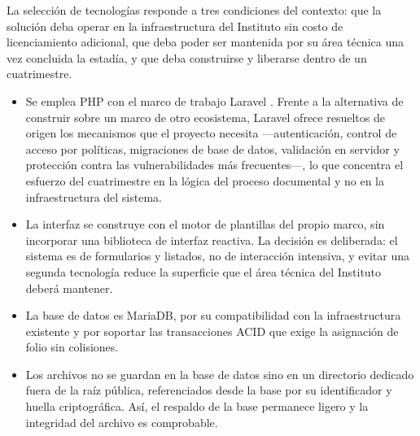 La selección de tecnologías responde a tres condiciones del contexto: que la solución deba operar en la infraestructura del Instituto sin costo de licenciamiento adicional, que deba poder ser mantenida por su área técnica una vez concluida la estadía, y que deba construirse y liberarse dentro de un cuatrimestre.

\begin{description}[leftmargin=0pt,font=\bfseries,itemsep=0.6em,parsep=0pt]
  \item[Lenguaje y marco de trabajo]\leavevmode
  \begin{itemize}[nosep,leftmargin=1.4em,topsep=1pt]
    \item Se emplea PHP con el marco de trabajo Laravel \cite{laraveldocs}. Frente a la alternativa de construir sobre un marco de otro ecosistema, Laravel ofrece resueltos de origen los mecanismos que el proyecto necesita —autenticación, control de acceso por políticas, migraciones de base de datos, validación en servidor y protección contra las vulnerabilidades más frecuentes—, lo que concentra el esfuerzo del cuatrimestre en la lógica del proceso documental y no en la infraestructura del sistema.
    \item La interfaz se construye con el motor de plantillas del propio marco, sin incorporar una biblioteca de interfaz reactiva. La decisión es deliberada: el sistema es de formularios y listados, no de interacción intensiva, y evitar una segunda tecnología reduce la superficie que el área técnica del Instituto deberá mantener.
  \end{itemize}

  \item[Persistencia y almacenamiento]\leavevmode
  \begin{itemize}[nosep,leftmargin=1.4em,topsep=1pt]
    \item La base de datos es MariaDB, por su compatibilidad con la infraestructura existente y por soportar las transacciones ACID que exige la asignación de folio sin colisiones.
    \item Los archivos no se guardan en la base de datos sino en un directorio dedicado fuera de la raíz pública, referenciados desde la base por su identificador y huella criptográfica. Así, el respaldo de la base permanece ligero y la integridad del archivo es comprobable.
  \end{itemize}


\end{description}
